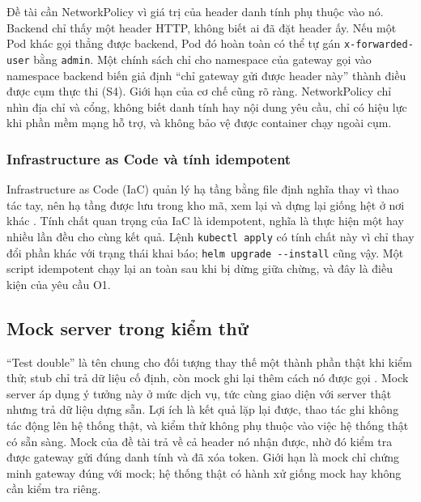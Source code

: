 \documentclass[a4paper]{article}
\begin{document}
Đề tài cần NetworkPolicy vì giá trị của header danh tính phụ thuộc vào nó. Backend chỉ thấy một header HTTP, không biết ai đã đặt header ấy. Nếu một Pod khác gọi thẳng được backend, Pod đó hoàn toàn có thể tự gán \texttt{x-forwarded-user} bằng \texttt{admin}. Một chính sách chỉ cho namespace của gateway gọi vào namespace backend biến giả định ``chỉ gateway gửi được header này'' thành điều được cụm thực thi (S4). Giới hạn của cơ chế cũng rõ ràng. NetworkPolicy chỉ nhìn địa chỉ và cổng, không biết danh tính hay nội dung yêu cầu, chỉ có hiệu lực khi phần mềm mạng hỗ trợ, và không bảo vệ được container chạy ngoài cụm.

\subsubsection{Infrastructure as Code và tính idempotent}

Infrastructure as Code (IaC) quản lý hạ tầng bằng file định nghĩa thay vì thao tác tay, nên hạ tầng được lưu trong kho mã, xem lại và dựng lại giống hệt ở nơi khác \parencite{morris2020iac}. Tính chất quan trọng của IaC là idempotent, nghĩa là thực hiện một hay nhiều lần đều cho cùng kết quả. Lệnh \texttt{kubectl apply} có tính chất này vì chỉ thay đổi phần khác với trạng thái khai báo; \texttt{helm upgrade -{}-install} cũng vậy. Một script idempotent chạy lại an toàn sau khi bị dừng giữa chừng, và đây là điều kiện của yêu cầu O1.

\subsection{Mock server trong kiểm thử}\label{sec:ch3-mock}

``Test double'' là tên chung cho đối tượng thay thế một thành phần thật khi kiểm thử; stub chỉ trả dữ liệu cố định, còn mock ghi lại thêm cách nó được gọi \parencite{fowler_mocks}. Mock server áp dụng ý tưởng này ở mức dịch vụ, tức cùng giao diện với server thật nhưng trả dữ liệu dựng sẵn. Lợi ích là kết quả lặp lại được, thao tác ghi không tác động lên hệ thống thật, và kiểm thử không phụ thuộc vào việc hệ thống thật có sẵn sàng. Mock của đề tài trả về cả header nó nhận được, nhờ đó kiểm tra được gateway gửi đúng danh tính và đã xóa token. Giới hạn là mock chỉ chứng minh gateway đúng với mock; hệ thống thật có hành xử giống mock hay không cần kiểm tra riêng.

\end{document}
